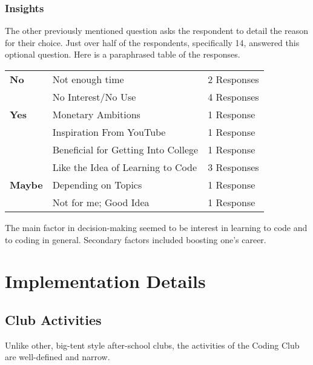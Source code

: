 \documentclass{report}
\begin{document}
        \subsubsection{Insights}

            The other previously mentioned question asks the respondent to detail the reason for their choice. Just over half of the respondents, specifically 14, answered this optional question. Here is a paraphrased table of the responses.\vspace{0.25em}

            \begin{center}
                \begin{tabular}{l|l|l}
                \textbf{No}  & Not enough time           & 2 Responses    \\
                             & No Interest/No Use        & 4 Responses    \\ \hline
                \textbf{Yes} & Monetary Ambitions        & 1 Response     \\
                             & Inspiration From YouTube  & 1 Response     \\
                             & Beneficial for Getting Into College & 1 Response \\
                             & Like the Idea of Learning to Code & 3 Responses \\ \hline
                \textbf{Maybe} & Depending on Topics & 1 Response   \\
                               & Not for me; Good Idea & 1 Response \\
                \end{tabular}
            \end{center}

            The main factor in decision-making seemed to be interest in learning to code and to coding in general. Secondary factors included boosting one's career.
    \section{Implementation Details}

        \subsection{Club Activities}

            Unlike other, big-tent style after-school clubs, the activities of the Coding Club are well-defined and narrow.
\end{document}
